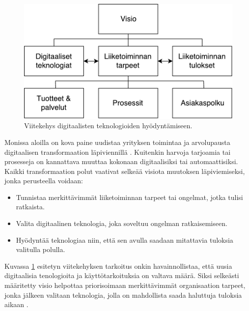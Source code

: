 \documentclass[finnish,12pt,a4paper,pdftex]{article}
\begin{document}
\begin{figure}[!h]
    \centering
    \includegraphics[scale=0.6]{images/digitaalinenvisio.pdf}
    \caption{Viitekehys digitaalisten teknologioiden hyödyntämiseen. \citep{lamoureux}}
    \label{fig:digivisio}
\end{figure}

\noindent Monissa aloilla on kova paine uudistaa yrityksen toimintaa ja arvolupausta digitaalisen transformaation läpiviennillä \citep{ibmtrans}. Kuitenkin harvoja tarjoamia tai prosesseja on kannattava muuttaa kokonaan digitaalisiksi tai automaattisiksi. Kaikki transformaation polut vaativat selkeää visiota muutoksen läpiviemiseksi, jonka perusteella voidaan: 

\begin{itemize}
\setlength{\itemsep}{0pt}
    \item Tunnistaa merkittävimmät liiketoiminnan tarpeet tai ongelmat, jotka tulisi ratkaista.
    \item Valita digitaalinen teknologia, joka soveltuu ongelman ratkaisemiseen.
    \item Hyödyntää teknologiaa niin, että sen avulla saadaan mitattavia tuloksia valitulla polulla.
\end{itemize}

\noindent Kuvassa \ref{fig:digivisio} esitetyn viitekehyksen tarkoitus onkin havainnollistaa, että uusia digitaalisia tenologioita ja käyttötarkoituksia on valtava määrä. Siksi selkeästi määritetty visio helpottaa priorisoimaan merkittävimmät organisaation tarpeet, jonka jälkeen valitaan teknologia, jolla on mahdollista saada haluttuja tuloksia aikaan \citep{ibmtrans}.

\end{document}
